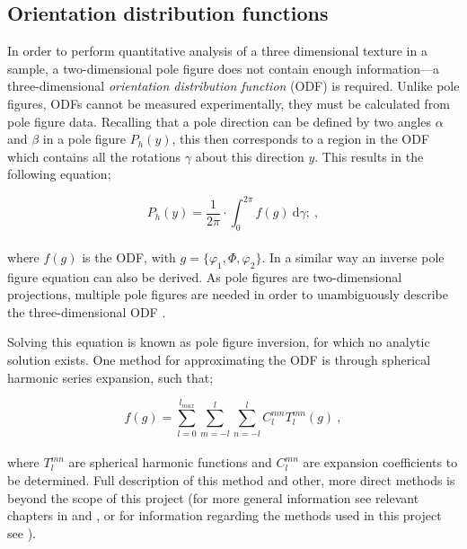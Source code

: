 \documentclass[a4paper,12pt]{report}
\numberwithin{equation}{chapter}
\begin{document}
\subsection{Orientation distribution functions} \label{subsec:ODFs}
In order to perform quantitative analysis of a three dimensional texture in a sample, a two-dimensional pole figure does not contain enough information---a three-dimensional \emph{orientation distribution function} (ODF) is required. Unlike pole figures, ODFs cannot be measured experimentally, they must be calculated from pole figure data. Recalling that a pole direction can be defined by two angles $\alpha$ and $\beta$ in a pole figure $P_h(y)$, this then corresponds to a region in the ODF which contains all the rotations $\gamma$ about this direction $y$. This results in the following equation; 




\begin{equation} \label{eq:pole_figures}
P_h(y) = \frac{1}{2\pi} \cdot \int_{0}^{2\pi}f(g)\ \mathrm{d}\gamma;\ ,
\end{equation}
\\
where $f(g)$ is the ODF, with $g = \{\varphi_1,\Phi,\varphi_2\}$. In a similar way an inverse pole figure equation can also be derived. As pole figures are two-dimensional projections, multiple pole figures are needed in order to unambiguously describe the three-dimensional ODF \citep[and in fact it is only determined uniquely for an infinite number of pole figures,][]{Bunge1985}.



Solving this equation is known as pole figure inversion, for which no analytic solution exists. One method for approximating the ODF is through spherical harmonic series expansion, such that;




\begin{equation} \label{eq:series_exp}
f(g) = \sum_{l=0}^{l_{max}} \sum_{m=-l}^l \sum_{n=-l}^l C_l^{mn} T_l^{mn} (g) \ ,
\end{equation}
\\
where $T_l^{mn}$ are spherical harmonic functions and $C_l^{mn}$ are expansion coefficients to be determined. Full description of this method and other, more direct methods is beyond the scope of this project (for more general information see relevant chapters in \cite{bunge1982texture,Bunge1985} and \cite{Randle2000}, or for information regarding the methods used in this project see \cite{Hielscher2008}).
\end{document}
